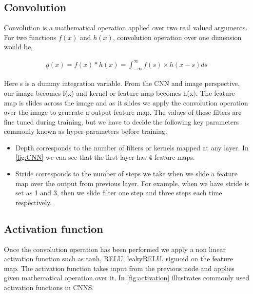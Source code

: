 \subsection{Convolution}

Convolution is a mathematical operation applied over two real valued arguments. For two functions $f(x)$ and $h(x)$, convolution operation over one dimension would be,

 \begin{equation}\label{eq:convolution-1d}
        \begin{aligned}
            g(x)=f(x) \ast h(x) = \int_{-\infty }^{\infty} f(s) \times h(x-s) ds
        \end{aligned}
\end{equation}

Here s is a dummy integration variable. 
From the CNN and image perspective, our image becomes f(x) and kernel or feature map becomes h(x). The feature map is slides across the image and as it slides we apply the convolution operation over the image to generate a output feature map. The values of these filters are fine tuned during training, but we have to decide the following key parameters commonly known as hyper-parameters before training.
\begin{itemize}
    \item  Depth corresponds to the number of filters or kernels mapped at any layer. In \cref{fig:CNN} we can see that the first layer has 4 feature maps.
    \item Stride corresponds to the number of steps we take when we slide a feature map over the output from previous layer. For example, when we have stride is set as 1 and 3, then we slide filter one step and three steps each time respectively.
\end{itemize}

\subsection{ Activation function}
Once the convolution operation has been performed we apply a non linear activation function such as tanh, RELU, leakyRELU, sigmoid on the feature map. The activation function takes input from the previous node and applies given mathematical operation over it. In \cref{fig:activation} illustrates commonly used activation functions in CNNS.


